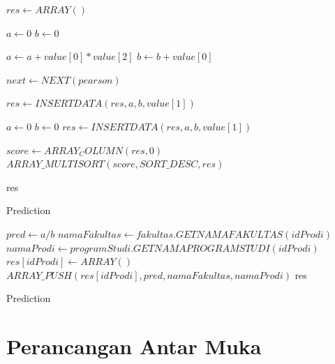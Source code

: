 \begin{algorithm}[H]
  \begin{algorithmic}[1]
        \State $res \gets ARRAY()$
        
        \State $a \gets 0$ 
        \State $b \gets 0$ 
        
            \State $a \gets a + value[0]*value[2]$
            \State $b \gets b + value[0]$
            
            \State $next \gets NEXT(pearson)$
            
                    \State $res \gets INSERTDATA(res, a, b, value[1])$
                    
                    \State $a \gets 0$
                    \State $b \gets 0$
                \EndIf
                \State $res \gets INSERTDATA(res, a, b, value[1])$
            \EndIf
        \EndFor
        
        \State $score \gets ARRAY_COLUMN(res,0)$ 
        \State $ARRAY\_MULTISORT(score, SORT\_DESC, res)$ 
        
        \State \Return res
    \EndProcedure
  \end{algorithmic} 
  \caption{Prediction}
  \label{alg:calculatePredict prediction}
\end{algorithm}

\begin{algorithm}[H]
  \begin{algorithmic}[1]
        \State $pred \gets a/b$
        \State $namaFakultas \gets fakultas.GETNAMAFAKULTAS(idProdi)$
        \State $namaProdi \gets programStudi.GETNAMAPROGRAMSTUDI(idProdi)$
        \State $res[idProdi] \gets ARRAY()$
        \State $ARRAY\_PUSH(res[idProdi], pred, namaFakultas, namaProdi)$
        \State \Return res
    \EndProcedure
  \end{algorithmic} 
  \caption{Prediction}
  \label{alg:insertData prediction}
\end{algorithm}


\section{Perancangan Antar Muka}
\label{sec:perancangan antar muka}

